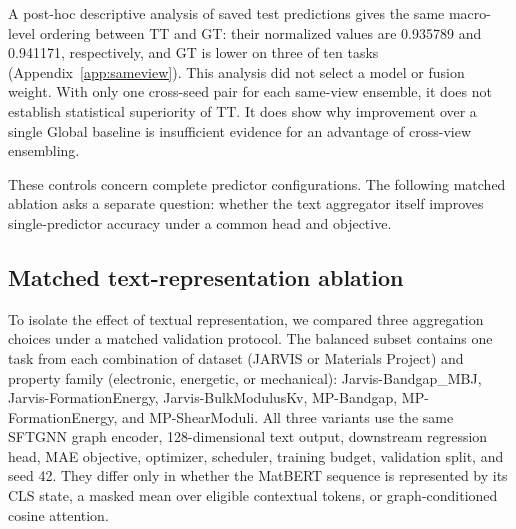\documentclass[a4paper,fleqn]{cas-sc}
\begin{document}
A post-hoc descriptive analysis of saved test predictions gives the same macro-level ordering between TT and GT: their normalized values are 0.935789 and 0.941171, respectively, and GT is lower on three of ten tasks (Appendix~\ref{app:sameview}). This analysis did not select a model or fusion weight. With only one cross-seed pair for each same-view ensemble, it does not establish statistical superiority of TT. It does show why improvement over a single Global baseline is insufficient evidence for an advantage of cross-view ensembling.

These controls concern complete predictor configurations. The following matched ablation asks a separate question: whether the text aggregator itself improves single-predictor accuracy under a common head and objective.


\FloatBarrier
\subsection{Matched text-representation ablation}\label{sec:matched}
To isolate the effect of textual representation, we compared three aggregation choices under a matched validation protocol. The balanced subset contains one task from each combination of dataset (JARVIS or Materials Project) and property family (electronic, energetic, or mechanical): Jarvis-Bandgap\_MBJ, Jarvis-FormationEnergy, Jarvis-BulkModulusKv, MP-Bandgap, MP-FormationEnergy, and MP-ShearModuli. All three variants use the same SFTGNN graph encoder, 128-dimensional text output, downstream regression head, MAE objective, optimizer, scheduler, training budget, validation split, and seed 42. They differ only in whether the MatBERT sequence is represented by its CLS state, a masked mean over eligible contextual tokens, or graph-conditioned cosine attention.
\end{document}
